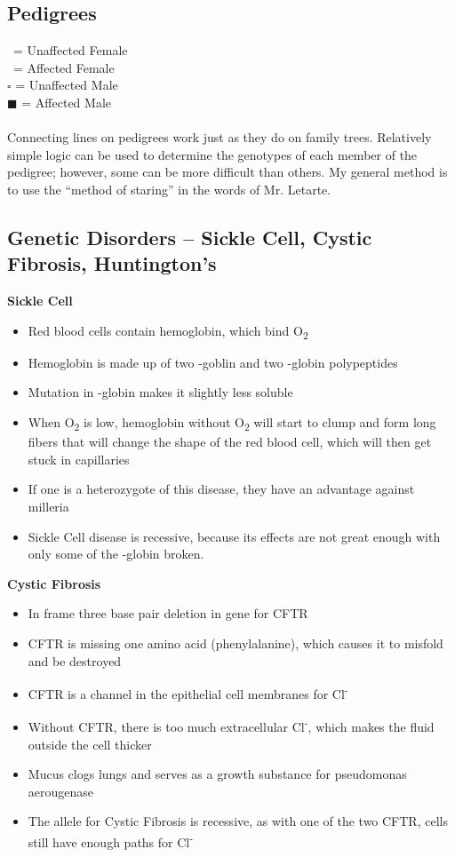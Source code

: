\documentclass{article}
\begin{document}
\subsection{Pedigrees}
\Circle \ = Unaffected Female\\
\CIRCLE \ = Affected Female\\
$\square$ = Unaffected Male\\
$\blacksquare$ = Affected Male\\
\\
Connecting lines on pedigrees work just as they do on family trees.
Relatively simple logic can be used to determine the genotypes of each member of the pedigree; however, some can be more difficult than others.
My general method is to use the ``method of staring'' in the words of Mr. Letarte.

\subsection{Genetic Disorders -- Sickle Cell, Cystic Fibrosis, Huntington's}
\textbf{Sickle Cell}
\begin{itemize}
\item Red blood cells contain hemoglobin, which bind O\textsubscript{2}
\item Hemoglobin is made up of two \textalpha -goblin and two \textbeta -globin polypeptides
\item Mutation in \textbeta -globin makes it slightly less soluble
\item When O\textsubscript{2} is low, hemoglobin without O\textsubscript{2} will start to
clump and form long fibers that will change the shape of the red blood cell, which will then get stuck in capillaries
\item If one is a heterozygote of this disease, they have an advantage against milleria
\item Sickle Cell disease is recessive, because its effects are not great enough with only some of the \textbeta -globin broken.
\end{itemize}

\textbf{Cystic Fibrosis}
\begin{itemize}
\item In frame three base pair deletion in gene for CFTR
\item CFTR is missing one amino acid (phenylalanine), which causes it to misfold and be
destroyed
\item CFTR is a channel in the epithelial cell membranes for Cl\textsuperscript{-}
\item Without CFTR, there is too much extracellular Cl\textsuperscript{-}, which makes the fluid outside the cell thicker
\item Mucus clogs lungs and serves as a growth substance for pseudomonas aerougenase
\item The allele for Cystic Fibrosis is recessive, as with one of the two CFTR, cells still have enough paths for Cl\textsuperscript{-}
\end{itemize}
\end{document}
